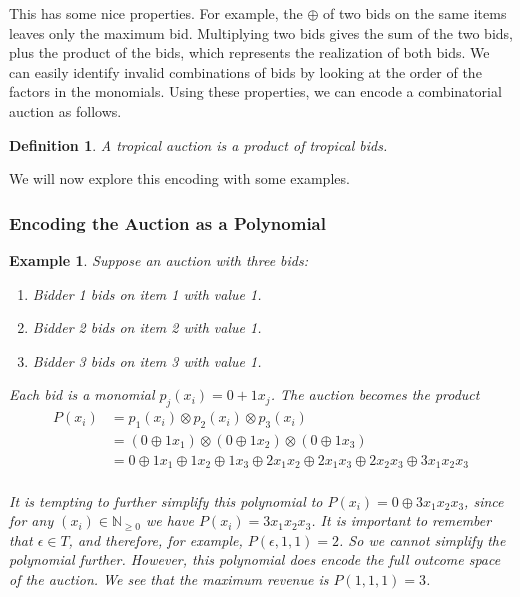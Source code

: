\documentclass{article}
\newcommand{\NN}{\mathbb{N}_{\geq 0}}
\newtheorem{definition}{Definition}
\newtheorem{example}{Example}
\begin{document}
This has some nice properties. For example, the $\oplus$ of two bids on the same items leaves only the maximum bid.
Multiplying two bids gives the sum of the two bids, plus the product of the bids, which represents the realization of both bids.
We can easily identify invalid combinations of bids by looking at the order of the factors in the monomials.
Using these properties, we can encode a combinatorial auction as follows.

\begin{definition}
	A tropical auction is a product of tropical bids.
\end{definition}

We will now explore this encoding with some examples.

\subsubsection{Encoding the Auction as a Polynomial}

\begin{example}
	Suppose an auction with three bids:
	\begin{enumerate}
		\item Bidder 1 bids on item 1 with value 1.
		\item Bidder 2 bids on item 2 with value 1.
		\item Bidder 3 bids on item 3 with value 1.
	\end{enumerate}
	Each bid is a monomial $p_j(x_i) = 0 + 1 x_j$.
	The auction becomes the product
	\begin{align*}
		P(x_i) & = p_1(x_i) \otimes p_2(x_i) \otimes p_3(x_i)                                                                       \\
		       & = (0 \oplus 1 x_1) \otimes (0 \oplus 1 x_2) \otimes (0 \oplus 1 x_3)                                               \\
		       & = 0 \oplus 1 x_1 \oplus 1 x_2 \oplus 1 x_3 \oplus 2 x_1 x_2 \oplus 2 x_1 x_3 \oplus 2 x_2 x_3 \oplus 3 x_1 x_2 x_3 \\
	\end{align*}

	It is tempting to further simplify this polynomial to $P(x_i) = 0 \oplus 3 x_1 x_2 x_3$, since for any $(x_i) \in \NN$ we have $P(x_i) = 3 x_1 x_2 x_3$.
	It is important to remember that $\epsilon \in T$, and therefore, for example, $P(\epsilon, 1, 1) = 2$.
	So we cannot simplify the polynomial further.
	However, this polynomial does encode the full outcome space of the auction.
	We see that the maximum revenue is $P(1,1,1) = 3$.
\end{example}
\end{document}
